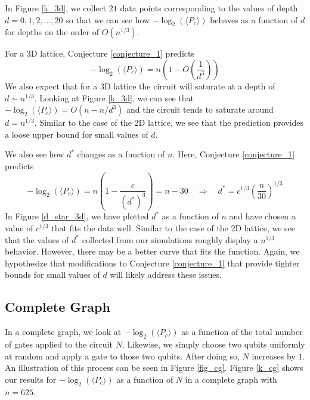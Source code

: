 \documentclass[11pt]{article}
\theoremstyle{definition}
\theoremstyle{plain}
\begin{document}
In Figure {\ref{k_3d}}, we collect $21$ data points corresponding to the values of depth $d = 0, 1, 2, \ldots, 20$ so that we can see how $-\log_2(\langle P_c \rangle)$ behaves as a function of $d$ for depths on the order of $O(n^{1/3})$.

For a 3D lattice, Conjecture {\ref{conjecture_1}} predicts
\begin{equation}
-\log_2(\langle P_c \rangle) = n \left( 1 - O\left(\frac{1}{d^3} \right) \right) 
\end{equation}
We also expect that for a 3D lattice the circuit will saturate at a depth of $d \sim n^{1/3}$. Looking at Figure {\ref{k_3d}}, we can see that $-\log_2 (\langle P_c \rangle) = O(n - n/d^3)$ and the circuit tends to saturate around $d = n^{1/3}$. Similar to the case of the 2D lattice, we see that the prediction provides a loose upper bound for small values of $d$. 

We also see how $d^*$ changes as a function of $n$. Here, Conjecture {\ref{conjecture_1}} predicts
\begin{equation}
  -\log_2(\langle P_c \rangle) = n \left( 1 - \frac{c}{{(d^*)}^3} \right) = n - 30
  \quad \Rightarrow \quad
  d^* = c^{1/3} {\left( \frac{n}{30} \right)}^{1/3}
\end{equation}
In Figure {\ref{d_star_3d}}, we have plotted $d^*$ as a function of $n$ and have chosen a value of $c^{1/3}$ that fits the data well. Similar to the case of the 2D lattice, we see that the values of $d^*$ collected from our simulations roughly display a $n^{1/3}$ behavior. However, there may be a better curve that fits the function. Again, we hypothesize that modifications to Conjecture {\ref{conjecture_1}} that provide tighter bounds for small values of $d$ will likely address these issues. 

\subsection{Complete Graph}
In a complete graph, we look at $-\log_2(\langle P_c \rangle)$ as a function of the total number of gates applied to the circuit $N$. Likewise, we simply choose two qubits uniformly at random and apply a gate to those two qubits. After doing so, $N$ increases by $1$. An illustration of this process can be seen in Figure {\ref{fig_cg}}. Figure {\ref{k_cg}} shows our results for $-\log_2(\langle P_c \rangle)$  as a function of $N$ in a complete graph with $n = 625$. 
\end{document}

